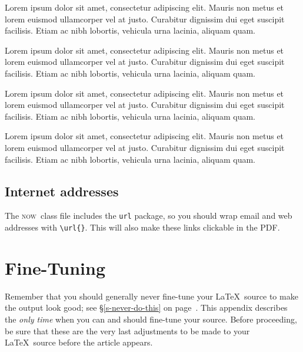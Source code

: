 \documentclass[openany]{now} %
\newcommand{\now}{\textsc{now}}
\begin{document}
\begin{corollary}
Lorem ipsum dolor sit amet, consectetur adipiscing elit. Mauris non metus et
lorem euismod ullamcorper vel at justo. Curabitur dignissim dui eget suscipit
facilisis. Etiam ac nibh lobortis, vehicula urna lacinia, aliquam quam.
\end{corollary}

\begin{remark}
Lorem ipsum dolor sit amet, consectetur adipiscing elit. Mauris non metus et
lorem euismod ullamcorper vel at justo. Curabitur dignissim dui eget suscipit
facilisis. Etiam ac nibh lobortis, vehicula urna lacinia, aliquam quam.
\end{remark}

\begin{proposition}
Lorem ipsum dolor sit amet, consectetur adipiscing elit. Mauris non metus et
lorem euismod ullamcorper vel at justo. Curabitur dignissim dui eget suscipit
facilisis. Etiam ac nibh lobortis, vehicula urna lacinia, aliquam quam.
\end{proposition}

\begin{example}
Lorem ipsum dolor sit amet, consectetur adipiscing elit. Mauris non metus et
lorem euismod ullamcorper vel at justo. Curabitur dignissim dui eget suscipit
facilisis. Etiam ac nibh lobortis, vehicula urna lacinia, aliquam quam.
\end{example}

\section{Internet addresses}

The \now\ class file includes the \texttt{url} package, so you should wrap
email and web addresses with \texttt{\textbackslash url\{\}}. This will
also make these links clickable in the PDF.

\chapter{Fine-Tuning}
\label{c-fine-tuning}

Remember that you should generally never fine-tune your \LaTeX\ source to make
the output look good; see \S\ref{s-never-do-this} on
page~\pageref{s-never-do-this}.  This appendix describes the \emph{only time}
when you can and should fine-tune your source.  Before proceeding, be
sure that these are the very last adjustments to be made to your \LaTeX\
source before the article appears.
\end{document}
